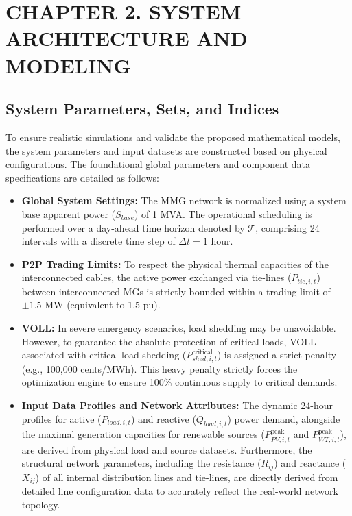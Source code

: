 \section*{CHAPTER 2. SYSTEM ARCHITECTURE AND MODELING}

\setcounter{section}{2}
\setcounter{subsection}{0}
\setcounter{figure}{0}
\setcounter{table}{0}



\subsection{System Parameters, Sets, and Indices}

To ensure realistic simulations and validate the proposed mathematical models, the system parameters and input datasets are constructed based on physical configurations. The foundational global parameters and component data specifications are detailed as follows:

\begin{itemize}
    \item \textbf{Global System Settings:} The MMG network is normalized using a system base apparent power ($S_{base}$) of 1 MVA. The operational scheduling is performed over a day-ahead time horizon denoted by $\mathcal{T}$, comprising 24 intervals with a discrete time step of $\Delta t = 1$ hour.
    
    \item \textbf{P2P Trading Limits:} To respect the physical thermal capacities of the interconnected cables, the active power exchanged via tie-lines ($P_{tie,i,t}$) between interconnected MGs is strictly bounded within a trading limit of $\pm 1.5$ MW (equivalent to 1.5 pu).
    
    \item \textbf{VOLL:} In severe emergency scenarios, load shedding may be unavoidable. However, to guarantee the absolute protection of critical loads, VOLL associated with critical load shedding ($P_{shed,i,t}^{\text{critical}}$) is assigned a strict penalty (e.g., 100,000 cents/MWh). This heavy penalty strictly forces the optimization engine to ensure 100\% continuous supply to critical demands.
    
    \item \textbf{Input Data Profiles and Network Attributes:} The dynamic 24-hour profiles for active ($P_{load,i,t}$) and reactive ($Q_{load,i,t}$) power demand, alongside the maximal generation capacities for renewable sources ($P_{PV,i,t}^{\text{peak}}$ and $P_{WT,i,t}^{\text{peak}}$), are derived from physical load and source datasets. Furthermore, the structural network parameters, including the resistance ($R_{ij}$) and reactance ($X_{ij}$) of all internal distribution lines and tie-lines, are directly derived from detailed line configuration data to accurately reflect the real-world network topology.
\end{itemize}

